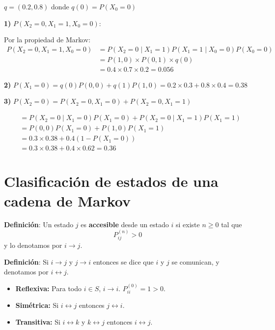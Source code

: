 \documentclass[12pt,a4paper]{article}
\newcommand{\definicion}[1]{%
\begin{definicionbox}
\textbf{Definición}: #1
\end{definicionbox}
}
\begin{document}
$q = (0.2, 0.8)$ donde $q(0) = P(X_0 = 0)$

\begin{center}
\end{center}

\textbf{1)} $P(X_2 = 0, X_1 = 1, X_0 = 0)$:

Por la propiedad de Markov:
\begin{align*}
P(X_2 = 0, X_1 = 1, X_0 = 0) &= P(X_2 = 0 \mid X_1 = 1) P(X_1 = 1 \mid X_0 = 0) P(X_0 = 0) \\
&= P(1,0) \times P(0,1) \times q(0) \\
&= 0.4 \times 0.7 \times 0.2 = 0.056
\end{align*}

\textbf{2)} $P(X_1 = 0) = q(0) P(0,0) + q(1) P(1,0) = 0.2 \times 0.3 + 0.8 \times 0.4 = 0.38$

\textbf{3)} $P(X_2 = 0) = P(X_2 = 0, X_1 = 0) + P(X_2 = 0, X_1 = 1)$

\begin{align*}
&= P(X_2 = 0 \mid X_1 = 0) P(X_1 = 0) + P(X_2 = 0 \mid X_1 = 1) P(X_1 = 1) \\
&= P(0,0) P(X_1 = 0) + P(1,0) P(X_1 = 1) \\
&= 0.3 \times 0.38 + 0.4 (1 - P(X_1 = 0)) \\
&= 0.3 \times 0.38 + 0.4 \times 0.62 = 0.36
\end{align*}

\section*{Clasificación de estados de una cadena de Markov}

\definicion{Un estado $j$ es \textbf{accesible} desde un estado $i$ si existe $n \geq 0$ tal que
\begin{equation*}
P_{ij}^{(n)} > 0
\end{equation*}
y lo denotamos por $i \to j$.}

\definicion{Si $i \to j$ y $j \to i$ entonces se dice que $i$ y $j$ se comunican, y denotamos por $i \leftrightarrow j$.

\begin{itemize}
    \item \textbf{Reflexiva:} Para todo $i \in S$, $i \to i$. $P_{ii}^{(0)} = 1 > 0$.
    \item \textbf{Simétrica:} Si $i \leftrightarrow j$ entonces $j \leftrightarrow i$.
    \item \textbf{Transitiva:} Si $i \leftrightarrow k$ y $k \leftrightarrow j$ entonces $i \leftrightarrow j$.
\end{itemize}

}
\end{document}
